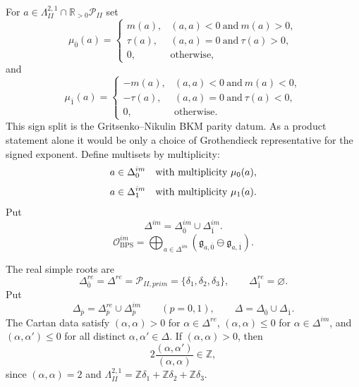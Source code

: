 \documentclass[11pt]{memoir}
\newcommand{\Z}{\mathbb{Z}} \newcommand{\C}{\mathbb{C}}
\newcommand{\R}{\mathbb{R}} \newcommand{\La}{\Lambda}
\newcommand{\Poly}{\mathcal{P}}
\begin{document}
\begin{definition}
For $a\in \La^{2,1}_{II}\cap\R_{>0}\Poly_{II}$ set
$$
\mu_{\overline 0}(a)=
\begin{cases}
m(a),& (a,a)<0\ \text{and}\ m(a)>0,\\
\tau(a),& (a,a)=0\ \text{and}\ \tau(a)>0,\\
0,&\text{otherwise},
\end{cases}
$$
and
$$
\mu_{\overline 1}(a)=
\begin{cases}
-m(a),& (a,a)<0\ \text{and}\ m(a)<0,\\
-\tau(a),& (a,a)=0\ \text{and}\ \tau(a)<0,\\
0,&\text{otherwise}.
\end{cases}
$$
This sign split is the Gritsenko--Nikulin BKM parity datum.  As a
product statement alone it would be only a choice of Grothendieck
representative for the signed exponent.  Define multisets by
multiplicity:
$$a\in\Delta_{\overline0}^{im}\quad\hbox{with multiplicity }
\mu_{\overline0}(a),$$
$$a\in\Delta_{\overline1}^{im}\quad\hbox{with multiplicity }
\mu_{\overline1}(a).$$
Put
$$\Delta^{im}=\Delta_{\overline0}^{im}\cup\Delta_{\overline1}^{im}.$$
$$\mathcal O_{\mathrm{BPS}}^{im}
=\bigoplus_{a\in\Delta^{im}}
\left(\mathfrak g_{a,\overline0}\ominus\mathfrak g_{a,\overline1}\right).$$
\end{definition}
The real simple roots are
$$\Delta_{\overline0}^{re}=\Delta^{re}=\Poly_{II,prim}
=\{\delta_1,\delta_2,\delta_3\},\qquad
\Delta_{\overline1}^{re}=\varnothing.$$
Put
$$\Delta_{\overline p}=\Delta_{\overline p}^{re}\cup
\Delta_{\overline p}^{im}\qquad(p=0,1),\qquad
\Delta=\Delta_{\overline0}\cup\Delta_{\overline1}.$$
The Cartan data satisfy $(\alpha,\alpha)>0$ for
$\alpha \in \Delta^{re}$, $(\alpha,\alpha)\leq 0$ for
$\alpha \in \Delta^{im}$, and
$(\alpha,\alpha')\leq 0$ for all distinct $\alpha,\alpha'\in\Delta$.
If $(\alpha,\alpha)>0$, then
$$2\frac{(\alpha,\alpha')}{(\alpha,\alpha)} \in \Z,$$
since $(\alpha,\alpha)=2$ and
$\La^{2,1}_{II}=\Z\delta_1+\Z\delta_2+\Z\delta_3$.
\end{document}
